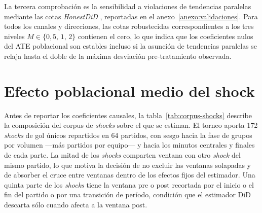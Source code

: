 La tercera comprobación es la sensibilidad a violaciones de
tendencias paralelas mediante las cotas \textit{HonestDiD}
\parencite{RambachanRoth2023}, reportadas en el
anexo~\ref{anexo:validaciones}. Para todos los canales y direcciones,
las cotas robustecidas correspondientes a los tres niveles
$M \in \{0{,}5,\, 1,\, 2\}$ contienen el cero, lo que indica que los
coeficientes nulos del ATE poblacional son estables incluso si la
asunción de tendencias paralelas se relaja hasta el doble de la
máxima desviación pre-tratamiento observada.


\section{Efecto poblacional medio del shock}
\label{sec:res-ate-poblacional}

Antes de reportar los coeficientes causales, la
tabla~\ref{tab:corpus-shocks} describe la composición del corpus de
\textit{shocks} sobre el que se estiman. El torneo aporta 172
\textit{shocks} de gol únicos repartidos en 64 partidos, con sesgo
hacia la fase de grupos por volumen ---más partidos por equipo--- y
hacia los minutos centrales y finales de cada parte. La mitad de los
\textit{shocks} comparten ventana con otro \textit{shock} del mismo
partido, lo que motiva la decisión de no excluir las ventanas
solapadas y de absorber el cruce entre ventanas dentro de los efectos
fijos
del estimador. Una quinta parte de los \textit{shocks} tiene la
ventana pre o post recortada por el inicio o el fin del partido o por
una transición de período, condición que el estimador DiD descarta
sólo cuando afecta a la ventana post.

